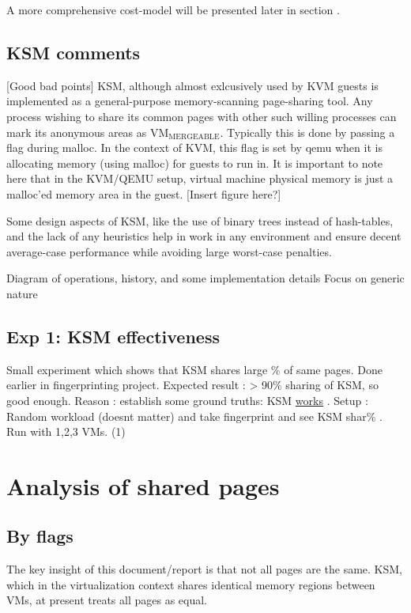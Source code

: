 \documentclass[11pt]{article}
\begin{document}
A more comprehensive cost-model will be presented later in section . 
\subsection{KSM comments}
\label{sec-4_1}

[Good bad points]
KSM, although almost exlcusively used by KVM guests is implemented as a general-purpose memory-scanning page-sharing tool. Any process wishing to share its common pages with other such willing processes can mark its anonymous areas as VM$_{\mathrm{MERGEABLE}}$. Typically this is done by passing a flag during malloc. 
In the context of KVM, this flag is set by qemu when it is allocating memory (using malloc) for guests to run in. It is important to note here that in the KVM/QEMU setup, virtual machine physical memory is just a malloc'ed memory area in the guest. 
[Insert figure here?]

Some design aspects of KSM, like the use of binary trees instead of hash-tables, and the lack of any heuristics help in work in any environment and ensure decent average-case performance while avoiding large worst-case penalties. 


Diagram of operations, history, and some implementation details
Focus on generic nature
\subsection{Exp 1: KSM effectiveness}
\label{sec-4_2}

Small experiment which shows that KSM shares large \% of same pages. Done earlier in fingerprinting project.
Expected result : > 90\% sharing of KSM, so good enough.
Reason : establish some ground truths: KSM \underline{works} .
Setup : Random workload (doesnt matter) and take fingerprint and see KSM shar\% . Run with 1,2,3 VMs.
(1)
\section{Analysis of shared pages}
\label{sec-5}
\subsection{By flags}
\label{sec-5_1}

The key insight of this document/report is that not all pages are the
same. KSM, which in the virtualization context shares identical memory
regions between VMs, at present treats all pages as equal. 
\end{document}
